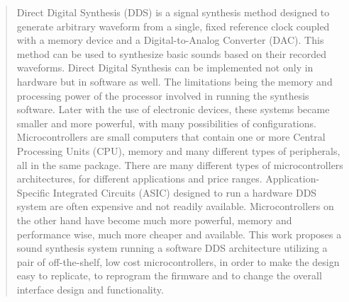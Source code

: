 

\begin{abstract}
Direct Digital Synthesis (DDS) is a signal synthesis method designed to generate arbitrary waveform from a single, fixed reference clock coupled with a memory device and a Digital-to-Analog Converter (DAC). This method can be used to synthesize basic sounds based on their recorded waveforms. Direct Digital Synthesis can be implemented not only in hardware but in software as well. The limitations being the memory and processing power of the processor involved in running the synthesis software.  Later with the use of electronic devices, these systems became smaller and more powerful, with many possibilities of configurations.
Microcontrollers are small computers that contain one or more Central Processing Units (CPU), memory and many different types of peripherals, all in the same package. There are many different types of microcontrollers architectures, for different applications and price ranges. Application-Specific Integrated Circuits (ASIC) designed to run a hardware DDS system are often expensive and not readily available. Microcontrollers on the other hand have become much more powerful, memory and performance wise, much more cheaper and available.
This work proposes a sound synthesis system running a software DDS architecture utilizing a pair of off-the-shelf, low cost microcontrollers, in order to make the design easy to replicate, to reprogram the firmware and to change the overall interface design and functionality.
\end{abstract}

